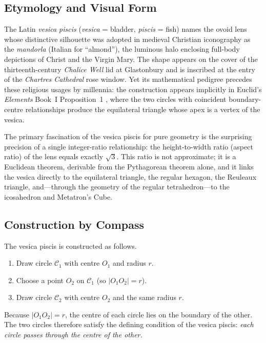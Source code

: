 \subsection{Etymology and Visual Form}
\label{subsec:ch11-etymology}

The Latin \emph{vesica piscis} (\emph{vesica} = bladder, \emph{piscis}
= fish) names the ovoid lens whose distinctive silhouette was adopted in
medieval Christian iconography as the \emph{mandorla} (Italian for
``almond''), the luminous halo enclosing full-body depictions of Christ
and the Virgin Mary.
The shape appears on the cover of the thirteenth-century \emph{Chalice Well} lid
at Glastonbury and is inscribed at the entry of the \emph{Chartres Cathedral}
rose window.
Yet its mathematical pedigree precedes these religious usages by millennia:
the construction appears implicitly in Euclid's \emph{Elements}
Book~I Proposition~1 \cite{euclid_elements}, where the two circles with
coincident boundary-centre relationships produce the equilateral triangle
whose apex is a vertex of the vesica.

The primary fascination of the vesica piscis for pure geometry is the
surprising precision of a single integer-ratio relationship:
the height-to-width ratio (aspect ratio) of the lens equals exactly
\(\sqrt{3}\).
This ratio is not approximate; it is a Euclidean theorem,
derivable from the Pythagorean theorem alone,
and it links the vesica directly to the equilateral triangle,
the regular hexagon, the Reuleaux triangle, and—through the
geometry of the regular tetrahedron—to the icosahedron and
Metatron's Cube.

\subsection{Construction by Compass}
\label{subsec:ch11-construction}

The vesica piscis is constructed as follows.

\begin{enumerate}
\item Draw circle \(\mathcal{C}_1\) with centre \(O_1\) and radius \(r\).
\item Choose a point \(O_2\) on \(\mathcal{C}_1\) (so
      \(|O_1 O_2| = r\)).
\item Draw circle \(\mathcal{C}_2\) with centre \(O_2\) and the same
      radius \(r\).
\end{enumerate}

Because \(|O_1 O_2| = r\), the centre of each circle lies on the
boundary of the other.
The two circles therefore satisfy the defining condition of the vesica
piscis: \emph{each circle passes through the centre of the other.}

